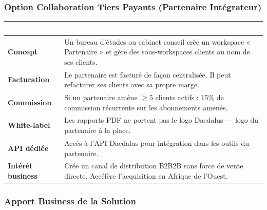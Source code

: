 \documentclass[12pt,a4paper]{article}
\begin{document}
\subsubsection{Option Collaboration Tiers Payants (Partenaire Intégrateur)}

\begin{tabularx}{\textwidth}{|l|X|}
\hline
\rowcolor{tablehead}\textcolor{white}{\textbf{Aspect}} & \textcolor{white}{\textbf{Description}} \\
\hline
\textbf{Concept} & Un bureau d'études ou cabinet-conseil crée un workspace « Partenaire » et gère des sous-workspaces clients au nom de ses clients. \\
\hline
\textbf{Facturation} & Le partenaire est facturé de façon centralisée. Il peut refacturer ses clients avec sa propre marge. \\
\hline
\textbf{Commission} & Si un partenaire amène $\geq 5$ clients actifs : 15\% de commission récurrente sur les abonnements amenés. \\
\hline
\textbf{White-label} & Les rapports PDF ne portent pas le logo Daedalus — logo du partenaire à la place. \\
\hline
\textbf{API dédiée} & Accès à l'API Daedalus pour intégration dans les outils du partenaire. \\
\hline
\textbf{Intérêt business} & Crée un canal de distribution B2B2B sans force de vente directe. Accélère l'acquisition en Afrique de l'Ouest. \\
\hline
\end{tabularx}

\subsubsection{Apport Business de la Solution}
\end{document}
